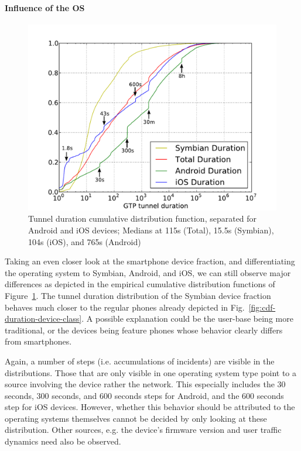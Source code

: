 \paragraph{Influence of the OS}

\begin{figure}
	\centering
	\includegraphics[width=\columnwidth]{images/IMC2013/tunnel-dur-os-cdf-mod.pdf}
	\caption{Tunnel duration cumulative distribution function, separated for Android and iOS devices; Medians at 115s (Total), 15.5s (Symbian), 104s (iOS), and 765s (Android)}
	\label{fig:cdf-duration-os}
\end{figure}

Taking an even closer look at the smartphone device fraction, and differentiating the operating system to Symbian, Android, and iOS, we can still observe major differences as depicted in the empirical cumulative distribution functions of Figure~\ref{fig:cdf-duration-os}. The tunnel duration distribution of the Symbian device fraction behaves much closer to the regular phones already depicted in Fig.~\ref{fig:cdf-duration-device-class}. A possible explanation could be the user-base being more traditional, or the devices being feature phones whose behavior clearly differs from smartphones.

Again, a number of steps (i.e. accumulations of incidents) are visible in the distributions. Those that are only visible in one operating system type point to a source involving the device rather the network. This especially includes the 30 seconds, 300 seconds, and 600 seconds steps for Android, and the 600 seconds step for iOS devices. However, whether this behavior should be attributed to the operating systems themselves cannot be decided by only looking at these distribution. Other sources, e.g. the device's firmware version and user traffic dynamics need also be observed.

